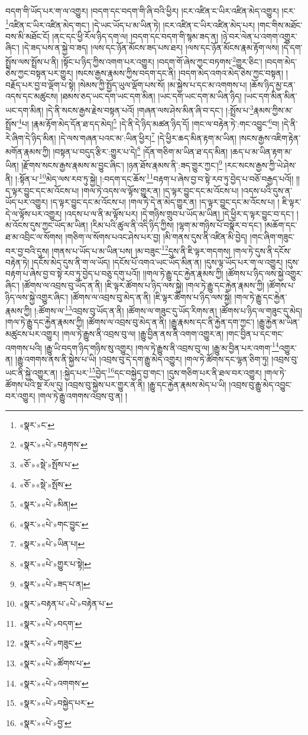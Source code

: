 བདག་གི་ཡོད་པར་ག་ལ་འགྱུར། །བདག་དང་བདག་གི་ཞི་བའི་ཕྱིར། །ངར་འཛིན་ང་ཡིར་འཛིན་མེད་འགྱུར། །ངར་\footnote{«སྣར་»ང་}འཛིན་ང་ཡིར་འཛིན་མེད་གང་། །དེ་ཡང་ཡོད་པ་མ་ཡིན་ཏེ། །ངར་འཛིན་ང་ཡིར་འཛིན་མེད་པར། །གང་གིས་མཐོང་བས་མི་མཐོང་ངོ། །ནང་དང་ཕྱི་རོལ་ཉིད་དག་ལ། །བདག་དང་བདག་གི་སྙམ་ཟད་ན། །ཉེ་བར་ལེན་པ་འགག་འགྱུར་ཞིང་། །དེ་ཟད་པས་ན་སྐྱེ་བ་ཟད། །ལས་དང་ཉོན་མོངས་ཟད་པས་ཐར། །ལས་དང་ཉོན་མོངས་རྣམ་རྟོག་ལས། །དེ་དག་སྤྲོས་ལས་སྤྲོས་པ་ནི། །སྟོང་པ་ཉིད་ཀྱིས་འགག་པར་འགྱུར། །བདག་གོ་ཞེས་ཀྱང་བཏགས་\footnote{«སྣར་»«པེ་»བརྟགས་}གྱུར་ཅིང་། །བདག་མེད་ཅེས་ཀྱང་བསྟན་པར་གྱུར། །སངས་རྒྱས་རྣམས་ཀྱིས་བདག་དང་ནི། །བདག་མེད་འགའ་མེད་ཅེས་ཀྱང་བསྟན། །བརྗོད་པར་བྱ་བ་ལྡོག་པ་སྟེ། །སེམས་ཀྱི་སྤྱོད་ཡུལ་ལྡོག་པས་སོ། །མ་སྐྱེས་པ་དང་མ་འགགས་པ། །ཆོས་ཉིད་མྱ་ངན་འདས་དང་མཚུངས། །ཐམས་ཅད་ཡང་དག་ཡང་དག་མིན། །ཡང་དག་ཡང་དག་མ་ཡིན་ཉིད། །ཡང་དག་མིན་མིན་ཡང་དག་མིན། །དེ་ནི་སངས་རྒྱས་རྗེས་བསྟན་པའོ། །གཞན་ལས་ཤེས་མིན་ཞི་བ་དང་། །:སྤྲོས་པ་\footnote{«ཅོ་»«སྡེ་»སྤོས་པ་}རྣམས་ཀྱིས་མ་སྤྲོས་\footnote{«ཅོ་»«སྡེ་»སྤོས་}པ། །རྣམ་རྟོག་མེད་དོན་ཐ་དད་མེད།\footnote{«སྣར་»«པེ་»མིན།} །དེ་ནི་དེ་ཉིད་མཚན་ཉིད་དོ། །གང་ལ་བརྟེན་ཏེ་:གང་འབྱུང་\footnote{«སྣར་»«པེ་»གང་བྱུང་}བ། །དེ་ནི་རེ་ཞིག་དེ་ཉིད་མིན། །དེ་ལས་གཞན་པའང་མ་:ཡིན་ཕྱིར།\footnote{«སྣར་»«པེ་»ཡིན་པ།} །དེ་ཕྱིར་ཆད་མིན་རྟག་མ་ཡིན། །སངས་རྒྱས་འཇིག་རྟེན་མགོན་རྣམས་ཀྱི། །བསྟན་པ་བདུད་རྩིར་:གྱུར་པ་དེ།\footnote{«སྣར་»«པེ་»གྱུར་པ་སྟེ།} །དོན་གཅིག་མ་ཡིན་ཐ་དད་མིན། །ཆད་པ་མ་ཡིན་རྟག་མ་ཡིན། །རྫོགས་སངས་རྒྱས་རྣམས་མ་བྱུང་ཞིང་། །ཉན་ཐོས་རྣམས་ནི་:ཟད་གྱུར་ཀྱང་།\footnote{«སྣར་»«པེ་»ཟད་པ་ན།} །རང་སངས་རྒྱས་ཀྱི་ཡེ་ཤེས་ནི། །:སྟོན་པ་\footnote{«སྣར་»བརྟན་པ་«པེ་»བརྟེན་པ་}མེད་ལས་རབ་ཏུ་སྐྱེ། །:བདག་དང་ཆོས་\footnote{«སྣར་»«པེ་»བདག་}བརྟག་པ་ཞེས་བྱ་བ་སྟེ་རབ་ཏུ་བྱེད་པ་བཅོ་བརྒྱད་པའོ།། །།ད་ལྟར་བྱུང་དང་མ་འོངས་པ། །གལ་ཏེ་འདས་ལ་ལྟོས་གྱུར་ན། །ད་ལྟར་བྱུང་དང་མ་འོངས་པ། །འདས་པའི་དུས་ན་ཡོད་པར་འགྱུར། །ད་ལྟར་བྱུང་དང་མ་འོངས་པ། །གལ་ཏེ་དེ་ན་མེད་གྱུར་ན། །ད་ལྟར་བྱུང་དང་མ་འོངས་པ། །
ཇི་ལྟར་དེ་ལ་ལྟོས་པར་འགྱུར། །འདས་པ་ལ་ནི་མ་ལྟོས་པར། །དེ་གཉིས་གྲུབ་པ་ཡོད་མ་ཡིན། །དེ་ཕྱིར་ད་ལྟར་བྱུང་བ་དང་། །མ་འོངས་དུས་ཀྱང་ཡོད་མ་ཡིན། །རིམ་པའི་ཚུལ་ནི་འདི་ཉིད་ཀྱིས། །ལྷག་མ་གཉིས་པོ་བསྣོར་བ་དང་། །མཆོག་དང་ཐ་མ་འབྲིང་ལ་སོགས། །གཅིག་ལ་སོགས་པའང་ཤེས་པར་བྱ། །མི་གནས་དུས་ནི་འཛིན་མི་བྱེད། །གང་ཞིག་གཟུང་བར་བྱ་བའི་དུས། །གནས་པ་ཡོད་པ་མ་ཡིན་པས། །མ་བཟུང་\footnote{«སྣར་»«པེ་»གཟུང་}དུས་ནི་ཇི་ལྟར་གདགས། །གལ་ཏེ་དུས་ནི་དངོས་བརྟེན་ཏེ། །དངོས་མེད་དུས་ནི་ག་ལ་ཡོད། །དངོས་པོ་འགའ་ཡང་ཡོད་མིན་ན། །དུས་ལྟ་ཡོད་པར་ག་ལ་འགྱུར། །དུས་བརྟག་པ་ཞེས་བྱ་བ་སྟེ་རབ་ཏུ་བྱེད་པ་བཅུ་དགུ་པའོ།། །།གལ་ཏེ་རྒྱུ་དང་རྐྱེན་རྣམས་ཀྱི། །ཚོགས་པ་ཉིད་ལས་སྐྱེ་འགྱུར་ཞིང་། །ཚོགས་ལ་འབྲས་བུ་ཡོད་ན་ནི། །ཇི་ལྟར་ཚོགས་པ་ཉིད་ལས་སྐྱེ། །གལ་ཏེ་རྒྱུ་དང་རྐྱེན་རྣམས་ཀྱི། །ཚོགས་པ་ཉིད་ལས་སྐྱེ་འགྱུར་ཞིང་། །ཚོགས་ལ་འབྲས་བུ་མེད་ན་ནི། །ཇི་ལྟར་ཚོགས་པ་ཉིད་ལས་སྐྱེ། །གལ་ཏེ་རྒྱུ་དང་རྐྱེན་རྣམས་ཀྱི། །:ཚོགས་ལ་\footnote{«སྣར་»«པེ་»ཚོགས་པ་}འབྲས་བུ་ཡོད་ན་ནི། །ཚོགས་ལ་གཟུང་དུ་ཡོད་རིགས་ན། །ཚོགས་པ་ཉིད་ལ་གཟུང་དུ་མེད། །གལ་ཏེ་རྒྱུ་དང་རྐྱེན་རྣམས་ཀྱི། །ཚོགས་ལ་འབྲས་བུ་མེད་ན་ནི། །རྒྱུ་རྣམས་དང་ནི་རྐྱེན་དག་ཀྱང་། །རྒྱུ་རྐྱེན་མ་ཡིན་མཚུངས་པར་འགྱུར། །གལ་ཏེ་རྒྱུས་ནི་འབྲས་བུ་ལ། །རྒྱུ་བྱིན་ནས་ནི་འགག་འགྱུར་ན། །གང་བྱིན་པ་དང་གང་འགགས་པའི། །རྒྱུ་ཡི་བདག་ཉིད་གཉིས་སུ་འགྱུར། །གལ་ཏེ་རྒྱུས་ནི་འབྲས་བུ་ལ། །རྒྱུ་མ་བྱིན་པར་འགག་\footnote{«སྣར་»«པེ་»འགགས་}འགྱུར་ན། །རྒྱུ་འགགས་ནས་ནི་སྐྱེས་པ་ཡི། །འབྲས་བུ་དེ་དག་རྒྱུ་མེད་འགྱུར། །གལ་ཏེ་ཚོགས་དང་ལྷན་ཅིག་ཏུ། །འབྲས་བུ་ཡང་ནི་སྐྱེ་འགྱུར་ན། །:སྐྱེད་པར་\footnote{«སྣར་»«པེ་»བསྐྱེད་པར་}བྱེད་\footnote{«སྣར་»«པེ་»བྱ་}དང་བསྐྱེད་བྱ་གང་། །དུས་གཅིག་པར་ནི་ཐལ་བར་འགྱུར། །གལ་ཏེ་ཚོགས་པའི་སྔ་རོལ་དུ། །འབྲས་བུ་སྐྱེས་པར་གྱུར་ན་ནི། །རྒྱུ་དང་རྐྱེན་རྣམས་མེད་པ་ཡི། །འབྲས་བུ་རྒྱུ་མེད་འབྱུང་བར་འགྱུར། །གལ་ཏེ་རྒྱུ་འགགས་འབྲས་བུ་ན། །
